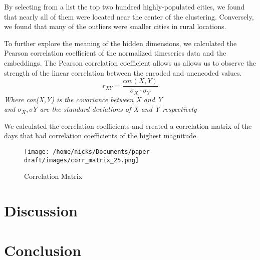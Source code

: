 \documentclass{article}
\begin{document}
By selecting from a list the top two hundred highly-populated cities, we found that nearly
all of them were located near the center of the clustering. Conversely, we found that many 
of the outliers were smaller cities in rural locations. \par

\newpage

To further explore the meaning of the hidden dimensions, we calculated the Pearson correlation
coefficient of the normalized timeseries data and the embeddings. The Pearson correlation
coefficient allows us allows us to observe the strength of the linear correlation between
the encoded and unencoded values. 
\begin{equation*}
    r_{XY}=\frac{cov(X,Y)}{\sigma_{X} \cdot \sigma_{Y}}
\end{equation*}
\textit{Where cov(X,Y) is the covariance between X and Y \\
and $\sigma_{X},\sigma{Y}$ are the standard deviations of X and Y respectively}

\vspace{0.1in}

We calculated the correlation coefficients and created a correlation matrix of the days that had
correlation coefficients of the highest magnitude.\par

\begin{figure}[h]
\texttt{[image: /home/nicks/Documents/paper-draft/images/corr\_matrix\_25.png]}
\caption{Correlation Matrix}
\label{fig:matrix}
\end{figure}
\section{Discussion}

\section{Conclusion}

\printbibliography
\end{document}
